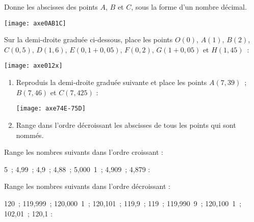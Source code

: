 \begin{exercice}
Donne les abscisses des points $A$, $B$ et $C$, sous la forme d'un nombre décimal.
\begin{center} \texttt{[image: axe0AB1C]} \end{center}
\end{exercice}


\begin{exercice}
Sur la demi-droite graduée ci-dessous, place les points $O(0)$, $A(1)$, $B(2)$, $C(0,5)$, $D(1,6)$, $E(0,1 + 0,05)$, $F(0,2)$, $G(1 + 0,05)$ et $H(1,45)$ :
\begin{center} \texttt{[image: axe012x]} \end{center}
\end{exercice}



\begin{exercice}
\begin{enumerate}
 \item Reproduis la demi-droite graduée suivante et place les points $A(7,39)$ ; $B(7,46)$ et $C(7,425)$ :
\begin{center} \texttt{[image: axe74E-75D]} \end{center}
 \item Range dans l'ordre décroissant les abscisses de tous les points qui sont nommés.
 \end{enumerate}
\end{exercice}



\newpage    %



\begin{exercice}[Rangement]
Range les nombres suivants dans l'ordre croissant :

5 ; 4,99 ; 4,9 ; 4,88 ; 5,000 1 ; 4,909 ; 4,879 :

\dotfill

\dotfill
\end{exercice}


\begin{exercice}
Range les nombres suivants dans l'ordre décroissant :

120 ; 119,999 ; 120,000 1 ; 120,101 ; 119,9 ; 119 ; 119,990 9 ; 120,100 1 ; 102,01 ; 120,1 :

\dotfill

\dotfill
\end{exercice}

